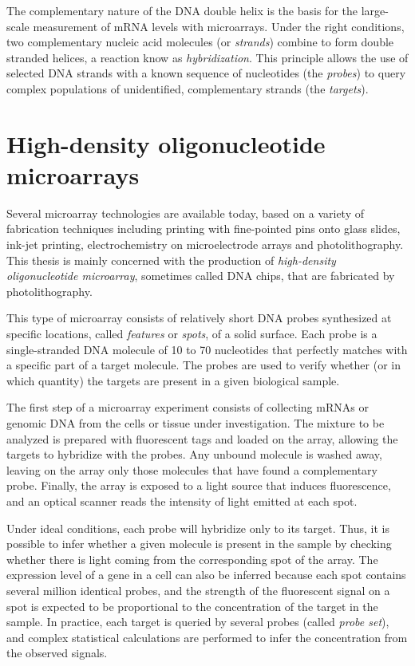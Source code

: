 The complementary nature of the DNA double helix is the basis for the
large-scale measurement of mRNA levels with microarrays. Under the right
conditions, two complementary nucleic acid molecules (or \emph{strands}) combine
to form double stranded helices, a reaction know as \emph{hybridization}. This
principle allows the use of selected DNA strands with a known sequence of
nucleotides (the \emph{probes}) to query complex populations of unidentified,
complementary strands (the \emph{targets}).

\section{High-density oligonucleotide microarrays}
\label{sec:intro_dnachip}

Several microarray technologies are available today, based on a variety of
fabrication techniques including printing with fine-pointed pins onto glass
slides, ink-jet printing, electrochemistry on microelectrode arrays and
photolithography. This thesis is mainly concerned with the production of
\emph{high-density oligonucleotide microarray}, sometimes called DNA chips,
that are fabricated by photolithography.

This type of microarray consists of relatively short DNA probes synthesized at
specific locations, called \emph{features} or \emph{spots}, of a solid surface.
Each probe is a single-stranded DNA molecule of 10 to 70 nucleotides that
perfectly matches with a specific part of a target molecule. The probes are used
to verify whether (or in which quantity) the targets are present in a given
biological sample.

The first step of a microarray experiment consists of collecting mRNAs or
genomic DNA from the cells or tissue under investigation. The mixture to be
analyzed is prepared with fluorescent tags and loaded on the array, allowing the
targets to hybridize with the probes. Any unbound molecule is washed away,
leaving on the array only those molecules that have found a complementary probe.
Finally, the array is exposed to a light source that induces fluorescence, and
an optical scanner reads the intensity of light emitted at each spot.

Under ideal conditions, each probe will hybridize only to its target.  Thus, it
is possible to infer whether a given molecule is present in the sample by
checking whether there is light coming from the corresponding spot of the array.
The expression level of a gene in a cell can also be inferred because each spot
contains several million identical probes, and the strength of the fluorescent
signal on a spot is expected to be proportional to the concentration of the
target in the sample. In practice, each target is queried by several probes
(called \emph{probe set}), and complex statistical calculations are performed to
infer the concentration from the observed signals.

